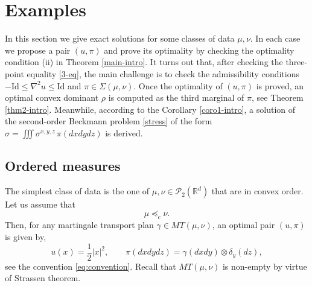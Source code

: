 \documentclass[11pt,letterpaper,reqno]{amsart}
\theoremstyle{definition}
\numberwithin{equation}{section}
\newcommand{\R}{\mathbb{R}}
\newcommand{\Rd}{\R^d}
\newcommand{\PP}{\mathcal{P}}
\newcommand{\abs}[1]{{\left \lvert #1 \right \rvert}}
\begin{document}
{\section{Examples} \label{examples}
In this section we give exact solutions for some classes of data $\mu, \nu$. In each case we propose a pair $(u,\pi)$ and prove its optimality  by checking the optimality condition (ii) in Theorem \ref{main-intro}. It turns out that, after checking the three-point equality \eqref{3-eq}, the main challenge is to check  the admissibility conditions $-\mathrm{Id} \leq \nabla^2 u \leq \mathrm{Id}$ and $\pi \in \Sigma(\mu,\nu)$.
Once the optimality of $(u,\pi)$ is proved,  an optimal convex dominant $\rho$ is computed as the third marginal of $\pi$, see Theorem \ref{thm2-intro}. Meanwhile,  according to the Corollary \ref{coro1-intro},  a solution of the second-order Beckmann  problem \eqref{stress} of the form $\sigma= \iiint \sigma^{x,y,z}\,\pi(dxdydz)$ is derived.

\subsection{Ordered measures}
The simplest class of data is the one of $\mu,\nu \in \PP_2(\Rd)$ that are in  convex order. Let us assume that
\begin{equation*}
	\mu \preceq_c \nu.
\end{equation*}
Then, for any martingale transport plan $\gamma \in  MT(\mu,\nu)$,  an optimal pair $(u,\pi)$ is given by,
\begin{equation} \label{optichoice}
	u(x) = \frac{1}{2} \abs{x}^2, \qquad \pi(dxdydz) = \gamma(dxdy) \otimes \delta_y(dz),
\end{equation}
see the convention \eqref{eq:convention}. Recall that $MT(\mu,\nu)$ is non-empty  by virtue of Strassen theorem.

}
\end{document}
